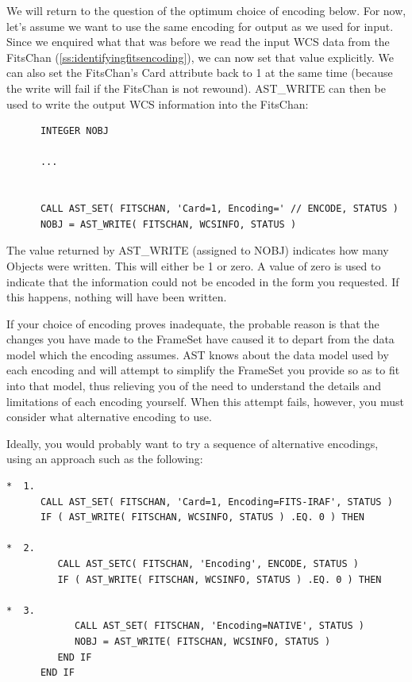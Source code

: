 \documentclass[twoside,11pt]{article}
\newcommand{\htmlref}[2]{#1}
\newcommand{\secref}[1]{\S\ref{#1}}
\renewcommand{\secref}[1]{\ref{#1}}
\begin{document}
We will return to the question of the optimum choice of encoding
below.  For now, let's assume we want to use the same encoding for
output as we used for input. Since we enquired what that was before we
read the input WCS data from the FitsChan
(\secref{ss:identifyingfitsencoding}), we can now set that value
explicitly. We can also set the FitsChan's \htmlref{Card}{Card} attribute back to 1 at
the same time (because the write will fail if the FitsChan is not
rewound). \htmlref{AST\_WRITE}{AST_WRITE} can then be used to write the output WCS
information into the FitsChan:

\small
\begin{verbatim}
      INTEGER NOBJ

      ...


      CALL AST_SET( FITSCHAN, 'Card=1, Encoding=' // ENCODE, STATUS )
      NOBJ = AST_WRITE( FITSCHAN, WCSINFO, STATUS )
\end{verbatim}
\normalsize

The value returned by AST\_WRITE (assigned to NOBJ) indicates how many
Objects were written. This will either be 1 or zero. A value of zero
is used to indicate that the information could not be encoded in the
form you requested. If this happens, nothing will have been written.

If your choice of encoding proves inadequate, the probable reason is
that the changes you have made to the FrameSet have caused it to
depart from the data model which the encoding assumes.  AST knows
about the data model used by each encoding and will attempt to
simplify the FrameSet you provide so as to fit into that model, thus
relieving you of the need to understand the details and limitations of
each encoding yourself. When this attempt fails, however, you must
consider what alternative encoding to use.

Ideally, you would probably want to try a sequence of alternative
encodings, using an approach such as the following:

\small
\begin{verbatim}
*  1.
      CALL AST_SET( FITSCHAN, 'Card=1, Encoding=FITS-IRAF', STATUS )
      IF ( AST_WRITE( FITSCHAN, WCSINFO, STATUS ) .EQ. 0 ) THEN

*  2.
         CALL AST_SETC( FITSCHAN, 'Encoding', ENCODE, STATUS )
         IF ( AST_WRITE( FITSCHAN, WCSINFO, STATUS ) .EQ. 0 ) THEN

*  3.
            CALL AST_SET( FITSCHAN, 'Encoding=NATIVE', STATUS )
            NOBJ = AST_WRITE( FITSCHAN, WCSINFO, STATUS )
         END IF
      END IF
\end{verbatim}
\normalsize
\end{document}
